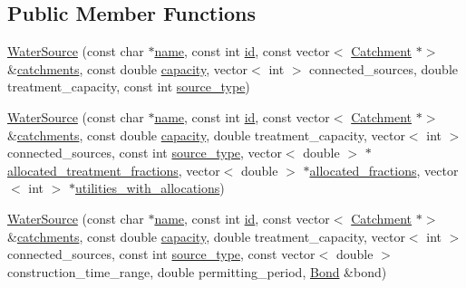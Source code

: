 \subsection*{Public Member Functions}
\begin{DoxyCompactItemize}
\item 
\mbox{\hyperlink{classWaterSource_a27b9d29d6cbb36d128f740f7ca00f500}{Water\+Source}} (const char $\ast$\mbox{\hyperlink{classWaterSource_a846ea74c5b453d014f594d41fee8c765}{name}}, const int \mbox{\hyperlink{classWaterSource_a6eafe5dfefd317877d1244e8a7c6e742}{id}}, const vector$<$ \mbox{\hyperlink{classCatchment}{Catchment}} $\ast$$>$ \&\mbox{\hyperlink{classWaterSource_a8c18c34f23f8a06685c1d12f462ed830}{catchments}}, const double \mbox{\hyperlink{classWaterSource_a2ec257b415b248214a8bce7fc5267723}{capacity}}, vector$<$ int $>$ connected\+\_\+sources, double treatment\+\_\+capacity, const int \mbox{\hyperlink{classWaterSource_afdd12c29fc74ea21dff1f1be9b8c2b7b}{source\+\_\+type}})
\item 
\mbox{\hyperlink{classWaterSource_a7723d343a0b8edff36018ca7acf09f62}{Water\+Source}} (const char $\ast$\mbox{\hyperlink{classWaterSource_a846ea74c5b453d014f594d41fee8c765}{name}}, const int \mbox{\hyperlink{classWaterSource_a6eafe5dfefd317877d1244e8a7c6e742}{id}}, const vector$<$ \mbox{\hyperlink{classCatchment}{Catchment}} $\ast$$>$ \&\mbox{\hyperlink{classWaterSource_a8c18c34f23f8a06685c1d12f462ed830}{catchments}}, const double \mbox{\hyperlink{classWaterSource_a2ec257b415b248214a8bce7fc5267723}{capacity}}, double treatment\+\_\+capacity, vector$<$ int $>$ connected\+\_\+sources, const int \mbox{\hyperlink{classWaterSource_afdd12c29fc74ea21dff1f1be9b8c2b7b}{source\+\_\+type}}, vector$<$ double $>$ $\ast$\mbox{\hyperlink{classWaterSource_aa73fe10cfc6579b2fb79529e1dde5140}{allocated\+\_\+treatment\+\_\+fractions}}, vector$<$ double $>$ $\ast$\mbox{\hyperlink{classWaterSource_a2f6655a80c4847fe039987255d9d998c}{allocated\+\_\+fractions}}, vector$<$ int $>$ $\ast$\mbox{\hyperlink{classWaterSource_ac345583fc2d0f7e1db31ee40244d7ace}{utilities\+\_\+with\+\_\+allocations}})
\item 
\mbox{\hyperlink{classWaterSource_a48641ff06b69505ab298f4f23e759a22}{Water\+Source}} (const char $\ast$\mbox{\hyperlink{classWaterSource_a846ea74c5b453d014f594d41fee8c765}{name}}, const int \mbox{\hyperlink{classWaterSource_a6eafe5dfefd317877d1244e8a7c6e742}{id}}, const vector$<$ \mbox{\hyperlink{classCatchment}{Catchment}} $\ast$$>$ \&\mbox{\hyperlink{classWaterSource_a8c18c34f23f8a06685c1d12f462ed830}{catchments}}, const double \mbox{\hyperlink{classWaterSource_a2ec257b415b248214a8bce7fc5267723}{capacity}}, double treatment\+\_\+capacity, vector$<$ int $>$ connected\+\_\+sources, const int \mbox{\hyperlink{classWaterSource_afdd12c29fc74ea21dff1f1be9b8c2b7b}{source\+\_\+type}}, const vector$<$ double $>$ construction\+\_\+time\+\_\+range, double permitting\+\_\+period, \mbox{\hyperlink{classBond}{Bond}} \&bond)
$$
\end{DoxyCompactItemize}
